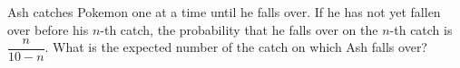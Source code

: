 Ash catches Pokemon one at a time until he falls over. If he has not yet fallen over before his $n$-th catch, the probability that he falls over on the $n$-th catch is $\dfrac{n}{10-n}$. What is the expected number of the catch on which Ash falls over?
